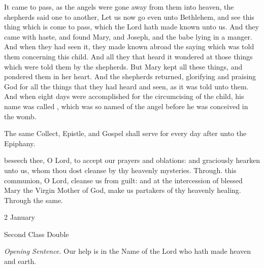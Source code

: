  It came to pass, as the angels were gone away from them into heaven, the shepherds said one to another, Let us now go even unto Bethlehem, and see this thing which is come to pass, which the Lord hath made known unto us. And they came with haste, and found Mary, and Joseph, and the babe lying in a manger. And when they had seen it, they made known abroad the saying which was told them concerning this child. And all they that heard it wondered at those things which were told them by the shepherds. But Mary kept all these things, and pondered them in her heart. And the shepherds returned, glorifying and praising God for all the things that they had heard and seen, as it was told unto them. And when eight days were accomplished for the circumcising of the child, his name was called , which was so named of the angel before he was conceived in the womb.
\begin{rubric}
    The same Collect, Epistle, and Gospel shall serve for every day after unto the Epiphany.
\end{rubric}
\secret
{} beseech thee, O Lord, to accept our prayers and oblations: and graciously hearken unto us, whom thou dost cleanse by thy heavenly mysteries. Through.
\postcommunion
{} this communion, O Lord, cleanse us from guilt: and at the intercession of blessed Mary the Virgin Mother of God, make us partakers of thy heavenly healing. Through the same.

\label{MostHolyName}
\begin{inhead}
{2 January}\par
{Second Class Double}
\end{inhead}
\par\noindent
\textit{Opening Sentence.} Our help is in the Name of the Lord who hath made heaven and earth.




